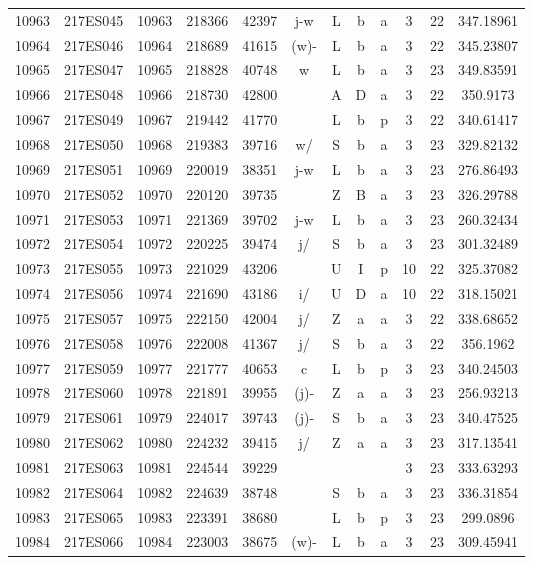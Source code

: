 \begin{tabular}{|*{12}{c|}}
10963 & 217ES045 & 10963 & 218366 & 42397 & j-w & L & b & a & 3 & 22 & 347.18961 \\ 
10964 & 217ES046 & 10964 & 218689 & 41615 & (w)- & L & b & a & 3 & 22 & 345.23807 \\ 
10965 & 217ES047 & 10965 & 218828 & 40748 & w & L & b & a & 3 & 23 & 349.83591 \\ 
10966 & 217ES048 & 10966 & 218730 & 42800 &  & A & D & a & 3 & 22 & 350.9173 \\ 
10967 & 217ES049 & 10967 & 219442 & 41770 &  & L & b & p & 3 & 22 & 340.61417 \\ 
10968 & 217ES050 & 10968 & 219383 & 39716 & w/ & S & b & a & 3 & 23 & 329.82132 \\ 
10969 & 217ES051 & 10969 & 220019 & 38351 & j-w & L & b & a & 3 & 23 & 276.86493 \\ 
10970 & 217ES052 & 10970 & 220120 & 39735 &  & Z & B & a & 3 & 23 & 326.29788 \\ 
10971 & 217ES053 & 10971 & 221369 & 39702 & j-w & L & b & a & 3 & 23 & 260.32434 \\ 
10972 & 217ES054 & 10972 & 220225 & 39474 & j/ & S & b & a & 3 & 23 & 301.32489 \\ 
10973 & 217ES055 & 10973 & 221029 & 43206 &  & U & I & p & 10 & 22 & 325.37082 \\ 
10974 & 217ES056 & 10974 & 221690 & 43186 & i/ & U & D & a & 10 & 22 & 318.15021 \\ 
10975 & 217ES057 & 10975 & 222150 & 42004 & j/ & Z & a & a & 3 & 22 & 338.68652 \\ 
10976 & 217ES058 & 10976 & 222008 & 41367 & j/ & S & b & a & 3 & 22 & 356.1962 \\ 
10977 & 217ES059 & 10977 & 221777 & 40653 & c & L & b & p & 3 & 23 & 340.24503 \\ 
10978 & 217ES060 & 10978 & 221891 & 39955 & (j)- & Z & a & a & 3 & 23 & 256.93213 \\ 
10979 & 217ES061 & 10979 & 224017 & 39743 & (j)- & S & b & a & 3 & 23 & 340.47525 \\ 
10980 & 217ES062 & 10980 & 224232 & 39415 & j/ & Z & a & a & 3 & 23 & 317.13541 \\ 
10981 & 217ES063 & 10981 & 224544 & 39229 &  &  &  &  & 3 & 23 & 333.63293 \\ 
10982 & 217ES064 & 10982 & 224639 & 38748 &  & S & b & a & 3 & 23 & 336.31854 \\ 
10983 & 217ES065 & 10983 & 223391 & 38680 &  & L & b & p & 3 & 23 & 299.0896 \\ 
10984 & 217ES066 & 10984 & 223003 & 38675 & (w)- & L & b & a & 3 & 23 & 309.45941 \\ 

\end{tabular}
